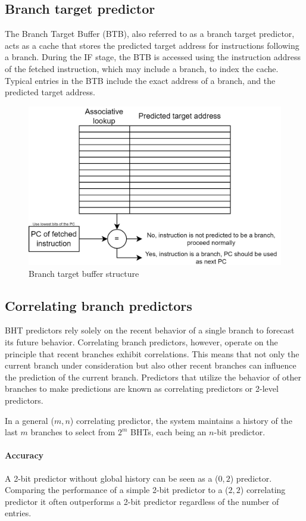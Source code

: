 \subsection{Branch target predictor}
The Branch Target Buffer (BTB), also referred to as a branch target predictor, acts as a cache that stores the predicted target address for instructions following a branch.
During the IF stage, the BTB is accessed using the instruction address of the fetched instruction, which may include a branch, to index the cache.
Typical entries in the BTB include the exact address of a branch, and the predicted target address.
\begin{figure}[H]
    \centering
    \includegraphics[width=0.5\linewidth]{images/btb.png}
    \caption{Branch target buffer structure}
\end{figure}

\subsection{Correlating branch predictors}
BHT predictors rely solely on the recent behavior of a single branch to forecast its future behavior.
Correlating branch predictors, however, operate on the principle that recent branches exhibit correlations. 
This means that not only the current branch under consideration but also other recent branches can influence the prediction of the current branch.
Predictors that utilize the behavior of other branches to make predictions are known as correlating predictors or 2-level predictors.

In a general ($m, n$) correlating predictor, the system maintains a history of the last $m$ branches to select from $2^m$ BHTs, each being an $n$-bit predictor.

\paragraph*{Accuracy}
A 2-bit predictor without global history can be seen as a ($0, 2$) predictor.
Comparing the performance of a simple 2-bit predictor to a ($2, 2$) correlating predictor it often outperforms a 2-bit predictor regardless of the number of entries.

